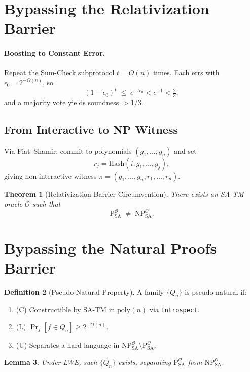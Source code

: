 \documentclass[12pt]{article}
\newcommand{\classP}{\mathrm{P}}
\newcommand{\classNP}{\mathrm{NP}}
\newcommand{\SA}{\mathrm{SA}}
\newcommand{\OO}{\mathcal{O}}
\newcommand{\poly}{\mathrm{poly}}
\theoremstyle{definition}
\newtheorem{definition}{Definition}[section]
\theoremstyle{plain}
\newtheorem{theorem}[definition]{Theorem}
\newtheorem{lemma}[definition]{Lemma}
\begin{document}
\section{Bypassing the Relativization Barrier}

\paragraph{Boosting to Constant Error.}
Repeat the Sum-Check subprotocol \(t=O(n)\) times. Each errs with
\(\epsilon_0=2^{-\Omega(n)}\), so
\[
  (1-\epsilon_0)^t \;\le\; e^{-t\epsilon_0} < e^{-1} < \tfrac23,
\]
and a majority vote yields soundness \(>1/3\).

\subsection*{From Interactive to NP Witness}
Via Fiat–Shamir: commit to polynomials \((g_1,\dots,g_n)\) and set
\[
  r_j=\mathrm{Hash}(i,g_1,\dots,g_j),
\]
giving non-interactive witness
\(\pi=(g_1,\dots,g_n,r_1,\dots,r_n)\).

\begin{theorem}[Relativization Barrier Circumvention]
There exists an SA-TM oracle \(\OO\) such that
\[
  \classP^{\OO}_{\SA} \;\neq\; \classNP^{\OO}_{\SA}.
\]
\end{theorem}

\section{Bypassing the Natural Proofs Barrier}

\begin{definition}[Pseudo-Natural Property]
A family \(\{Q_n\}\) is pseudo-natural if:
\begin{enumerate}
  \item (C) Constructible by SA-TM in \(\poly(n)\) via \texttt{Introspect}.
  \item (L) \(\Pr_f[f\in Q_n]\ge2^{-O(n)}\).
  \item (U) Separates a hard language in
    \(\classNP^{\OO}_{\SA}\setminus\classP^{\OO}_{\SA}\).
\end{enumerate}
\end{definition}

\begin{lemma}
Under LWE, such \(\{Q_n\}\) exists, separating
\(\classP^{\OO}_{\SA}\) from \(\classNP^{\OO}_{\SA}\).
\end{lemma}
\end{document}
